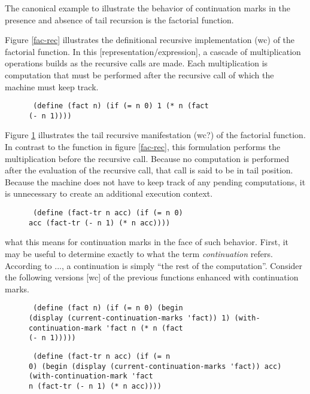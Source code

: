 \documentclass[ms]{byuprop}
\begin{document}
The canonical example to illustrate the behavior of continuation marks in the presence and
absence of tail recursion is the factorial function.

Figure \ref{fac-rec} illustrates the definitional recursive implementation (wc) of the
factorial function. In this [representation/expression], a cascade of multiplication
operations builds as the recursive calls are made. Each multiplication is computation that
must be performed after the recursive call of which the machine must keep track.


\begin{figure}  \begin{verbatim} (define (fact n) (if (= n 0) 1 (* n (fact
(- n 1)))) \end{verbatim} \end{figure}

Figure \ref{fac-tail-rec} illustrates the tail recursive manifestation (wc?) of the
factorial function. In contrast to the function in figure \ref{fac-rec}, this formulation
performs the multiplication before the recursive call. Because no computation is performed
after the evaluation of the recursive call, that call is said to be in tail position.
Because the machine does not have to keep track of any pending computations, it is
unnecessary to create an additional execution context.

\begin{figure} \label{fac-tail-rec} \begin{verbatim} (define (fact-tr n acc) (if (= n 0)
acc (fact-tr (- n 1) (* n acc)))) \end{verbatim} \end{figure}

what this means for continuation marks in the face of such behavior. First, it may be
useful to determine exactly to what the term \emph{continuation} refers. According to ...,
a continuation is simply ``the rest of the computation''. Consider the following versions
[wc] of the previous functions enhanced with continuation marks.

\begin{figure} \label{fac-rec-cm} \begin{verbatim} (define (fact n) (if (= n 0) (begin
(display (current-continuation-marks 'fact)) 1) (with-continuation-mark 'fact n (* n (fact
(- n 1))))) \end{verbatim} \end{figure}

\begin{figure} \label{fac-tail-rec-cm} \begin{verbatim} (define (fact-tr n acc) (if (= n
0) (begin (display (current-continuation-marks 'fact)) acc) (with-continuation-mark 'fact
n (fact-tr (- n 1) (* n acc)))) \end{verbatim} \end{figure}
\end{document}
